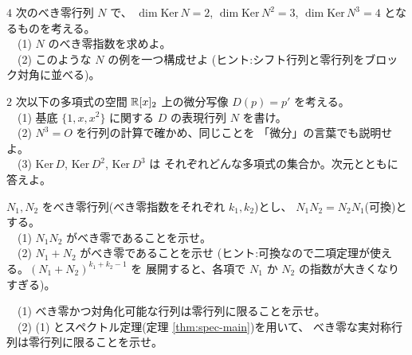 \begin{mondai}[発展]\label{q:nilp-ex9}
$4$ 次のべき零行列 $N$ で、
$\dim \mathrm{Ker}\,N = 2$, $\dim \mathrm{Ker}\,N^2 = 3$,
$\dim \mathrm{Ker}\,N^3 = 4$ となるものを考える。\\
　(1) $N$ のべき零指数を求めよ。\\
　(2) このような $N$ の例を一つ構成せよ
(ヒント:シフト行列と零行列をブロック対角に並べる)。
\end{mondai}

\begin{mondai}[発展]\label{q:nilp-ex10}
$2$ 次以下の多項式の空間 $\mathbb{R}[x]_2$ 上の微分写像 $D(p) = p'$ を考える。\\
　(1) 基底 $\{1, x, x^2\}$ に関する $D$ の表現行列 $N$ を書け。\\
　(2) $N^3 = O$ を行列の計算で確かめ、同じことを
「微分」の言葉でも説明せよ。\\
　(3) $\mathrm{Ker}\,D$, $\mathrm{Ker}\,D^2$, $\mathrm{Ker}\,D^3$ は
それぞれどんな多項式の集合か。次元とともに答えよ。
\end{mondai}

\begin{mondai}[証明]\label{q:nilp-ex11}
$N_1, N_2$ をべき零行列(べき零指数をそれぞれ $k_1, k_2$)とし、
$N_1 N_2 = N_2 N_1$(可換)とする。\\
　(1) $N_1 N_2$ がべき零であることを示せ。\\
　(2) $N_1 + N_2$ がべき零であることを示せ
(ヒント:可換なので二項定理が使える。$(N_1 + N_2)^{k_1 + k_2 - 1}$ を
展開すると、各項で $N_1$ か $N_2$ の指数が大きくなりすぎる)。
\end{mondai}

\begin{mondai}[証明]\label{q:nilp-ex12}
　(1) べき零かつ対角化可能な行列は零行列に限ることを示せ。\\
　(2) (1) とスペクトル定理(定理 \ref{thm:spec-main})を用いて、
べき零な実対称行列は零行列に限ることを示せ。
\end{mondai}

